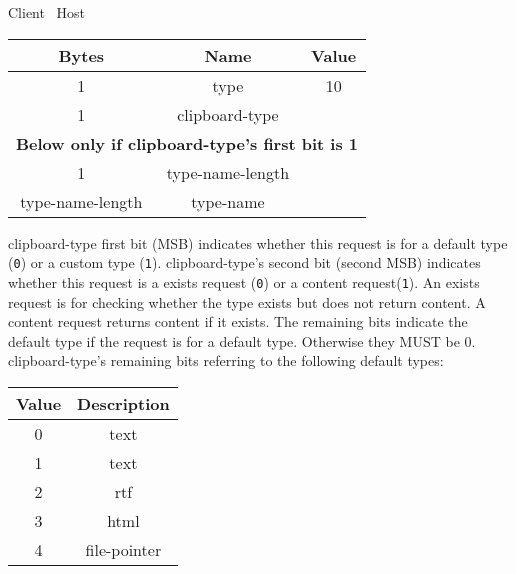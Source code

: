 \begin{center}
    Client \textrightarrow\ Host\\
    \begin{tabular}{|c|c|c|}
        \hline
        \textbf{Bytes}   & \textbf{Name}    & \textbf{Value} \\
        \hline
        1                & type             & 10              \\
        \hline
        1                & clipboard-type   &                \\
        \hline
        \multicolumn{3}{|c|}{\textbf{Below only if clipboard-type's first bit is 1} } \\
        \hline
        1                & type-name-length &                \\
        \hline
        type-name-length & type-name        &                \\
        \hline
    \end{tabular}
\end{center}

clipboard-type first bit (MSB) indicates whether this request is for a default type (\texttt{0}) or a custom type
(\texttt{1}). clipboard-type's second bit (second MSB) indicates whether this request is a exists request (\texttt{0}) or a
content request(\texttt{1}). An exists request is for checking whether the type exists but does not return content. A
content request returns content if it exists. The remaining bits indicate the default type if the request is for a
default type. Otherwise they MUST be 0.\\

clipboard-type's remaining bits referring to the following default types:

\begin{center}
    \begin{tabular}{|c|c|}
        \hline
        \textbf{Value} & \textbf{Description} \\
        \hline
        0              & text                 \\
        \hline
        1              & text                 \\
        \hline
        2              & rtf                  \\
        \hline
        3              & html                 \\
        \hline
        4              & file-pointer         \\
        \hline
    \end{tabular}
\end{center}

